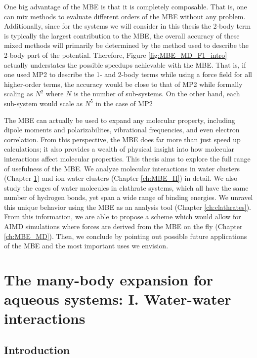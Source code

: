 \documentclass[11pt, proquest]{uwthesis}[2020/02/24]
\begin{document}
\par One big advantage of the MBE is that it is completely composable. That is, one can mix methods to evaluate different orders of the MBE without any problem. Additionally, since for the systems we will consider in this thesis the 2-body term is typically the largest contribution to the MBE, the overall accuracy of these mixed methods will primarily be determined by the method used to describe the 2-body part of the potential. Therefore, Figure \ref{fig:MBE_MD_F1_intro} actually understates the possible speedups achievable with the MBE. That is, if one used MP2 to describe the 1- and 2-body terms while using a force field for all higher-order terms, the accuracy would be close to that of MP2 while formally scaling as $N^2$ where $N$ is the number of sub-systems. On the other hand, each sub-system would scale as $N^5$ in the case of MP2

\par The MBE can actually be used to expand any molecular property, including dipole moments and polarizabilites\autocite{medders_many-body_2013}, vibrational frequencies\autocite{howard_n-body_2013,heindel_origin_2018}, and even electron correlation\autocite{boschen_correlation_2017}. From this perspective, the MBE does far more than just speed up calculations; it also provides a wealth of physical insight into how molecular interactions affect molecular properties. This thesis aims to explore the full range of usefulness of the MBE. We analyze molecular interactions in water clusters (Chapter \ref{ch:MBE_I}) and ion-water clusters (Chapter \ref{ch:MBE_II}) in detail. We also study the cages of water molecules in clathrate systems, which all have the same number of hydrogen bonds, yet span a wide range of binding energies. We unravel this unique behavior using the MBE as an analysis tool (Chapter \ref{ch:clathrates}). From this information, we are able to propose a scheme which would allow for AIMD simulations where forces are derived from the MBE on the fly (Chapter \ref{ch:MBE_MD}). Then, we conclude by pointing out possible future applications of the MBE and the most important uses we envision.

\chapter{The many-body expansion for aqueous systems: I. Water-water interactions}
\label{ch:MBE_I}

\section{Introduction}
\end{document}
